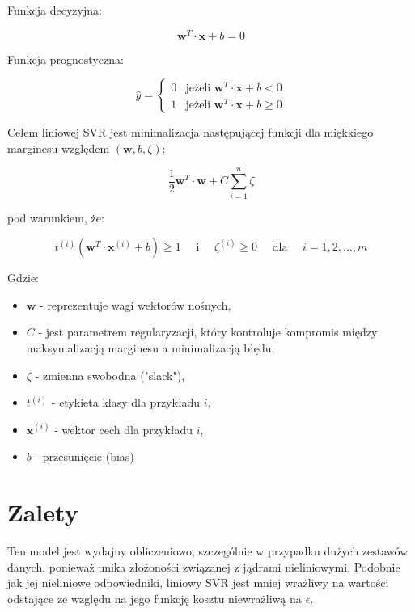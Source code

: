 Funkcja decyzyjna:

$$
\boldsymbol{w}^T \cdot \boldsymbol{x} + b = 0
$$

Funkcja prognostyczna:

$$
\hat{y} ={ \begin{cases}
    0 & \text{jeżeli } \boldsymbol{w}^T \cdot \boldsymbol{x} + b \lt 0 \\
    1 & \text{jeżeli } \boldsymbol{w}^T \cdot \boldsymbol{x} + b \geq 0
\end{cases}}
$$


Celem liniowej SVR jest minimalizacja następującej funkcji dla miękkiego marginesu względem $( \boldsymbol{w},b,\zeta)$:

$$
\frac{1}{2} \boldsymbol{w}^T \cdot \boldsymbol{w} + C \sum_{i=1}^{n} \zeta
$$

pod warunkiem, że:

$$
t^{(i)}(\boldsymbol{w}^T \cdot \boldsymbol{x}^{(i)} + b) \geq 1 \quad \text{ i } \quad \zeta^{(i)} \geq 0 \quad \text{ dla } \quad i=1,2,\dots,m
$$

Gdzie:
\begin{itemize}
\setlength\itemsep{-0.5em}
 \item  $\boldsymbol{w}$ - reprezentuje wagi wektorów nośnych,

\item $C$ - jest parametrem regularyzacji, który kontroluje kompromis między maksymalizacją marginesu a minimalizacją błędu,

 \item  $\zeta$ - zmienna swobodna ("slack"),

 \item  $t^{(i)}$ - etykieta klasy dla przykładu $i$,

 \item  $\boldsymbol{x}^{(i)}$ - wektor cech dla przykładu $i$,

\item $b$ - przesunięcie (bias)
\end{itemize}


{}
\section*{Zalety }
\vspace{-1.0em}
\label{sec:ml_challenges}

\hspace{1.5cm} Ten model jest wydajny obliczeniowo, szczególnie w przypadku dużych zestawów danych, ponieważ unika złożoności związanej z jądrami nieliniowymi.
Podobnie jak jej nieliniowe odpowiedniki, liniowy SVR jest mniej wrażliwy na wartości odstające ze względu na jego funkcję kosztu niewrażliwą na $\epsilon$.


